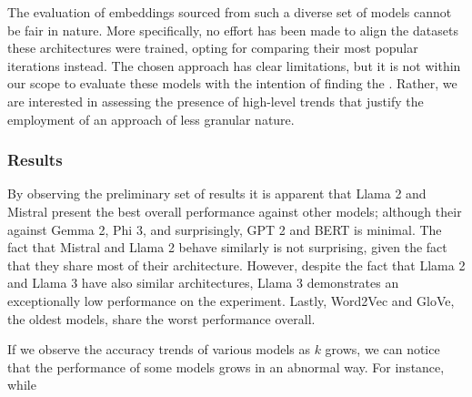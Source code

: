 
The evaluation of embeddings sourced from such a diverse set of models cannot be fair in nature.
More specifically, no effort has been made to align the datasets  these architectures were trained, opting for comparing their most popular iterations instead.
The chosen approach has clear limitations, but it is not within our scope to evaluate these models with the intention of finding the .
Rather, we are interested in assessing the presence of high-level trends that justify the employment of an approach of less granular nature.

\subsubsection{Results}


By observing the preliminary set of results it is apparent that Llama 2 and Mistral present the best overall performance against other models; although their  against Gemma 2, Phi 3, and surprisingly, GPT 2 and BERT is minimal.
The fact that Mistral and Llama 2 behave similarly is not surprising, given the fact that they share most of their architecture.
However, despite the fact that Llama 2 and Llama 3 have also similar architectures, Llama 3 demonstrates an exceptionally low performance on the experiment.
Lastly, Word2Vec and GloVe, the oldest models, share the worst performance overall.

If we observe the accuracy trends of various models as $k$ grows, we can notice that the performance of some models grows in an abnormal way.
For instance, while



